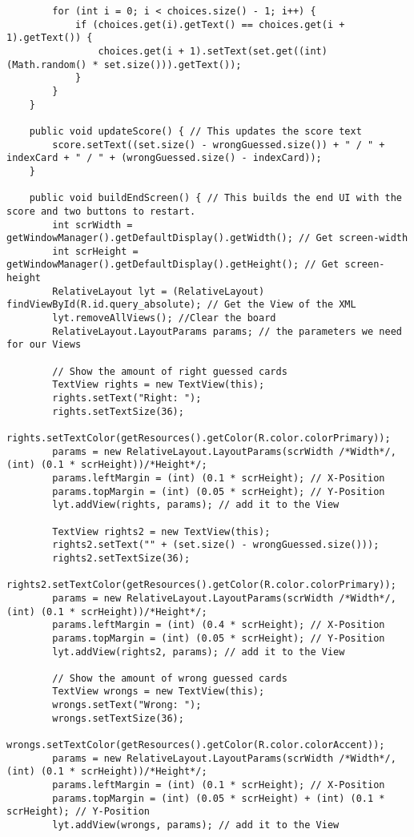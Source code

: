 \begin{lstlisting}
        for (int i = 0; i < choices.size() - 1; i++) {
            if (choices.get(i).getText() == choices.get(i + 1).getText()) {
                choices.get(i + 1).setText(set.get((int) (Math.random() * set.size())).getText());
            }
        }
    }

    public void updateScore() { // This updates the score text
        score.setText((set.size() - wrongGuessed.size()) + " / " + indexCard + " / " + (wrongGuessed.size() - indexCard));
    }

    public void buildEndScreen() { // This builds the end UI with the score and two buttons to restart.
        int scrWidth = getWindowManager().getDefaultDisplay().getWidth(); // Get screen-width
        int scrHeight = getWindowManager().getDefaultDisplay().getHeight(); // Get screen-height
        RelativeLayout lyt = (RelativeLayout) findViewById(R.id.query_absolute); // Get the View of the XML
        lyt.removeAllViews(); //Clear the board
        RelativeLayout.LayoutParams params; // the parameters we need for our Views

        // Show the amount of right guessed cards
        TextView rights = new TextView(this);
        rights.setText("Right: ");
        rights.setTextSize(36);
        rights.setTextColor(getResources().getColor(R.color.colorPrimary));
        params = new RelativeLayout.LayoutParams(scrWidth /*Width*/, (int) (0.1 * scrHeight))/*Height*/;
        params.leftMargin = (int) (0.1 * scrHeight); // X-Position
        params.topMargin = (int) (0.05 * scrHeight); // Y-Position
        lyt.addView(rights, params); // add it to the View

        TextView rights2 = new TextView(this);
        rights2.setText("" + (set.size() - wrongGuessed.size()));
        rights2.setTextSize(36);
        rights2.setTextColor(getResources().getColor(R.color.colorPrimary));
        params = new RelativeLayout.LayoutParams(scrWidth /*Width*/, (int) (0.1 * scrHeight))/*Height*/;
        params.leftMargin = (int) (0.4 * scrHeight); // X-Position
        params.topMargin = (int) (0.05 * scrHeight); // Y-Position
        lyt.addView(rights2, params); // add it to the View

        // Show the amount of wrong guessed cards
        TextView wrongs = new TextView(this);
        wrongs.setText("Wrong: ");
        wrongs.setTextSize(36);
        wrongs.setTextColor(getResources().getColor(R.color.colorAccent));
        params = new RelativeLayout.LayoutParams(scrWidth /*Width*/, (int) (0.1 * scrHeight))/*Height*/;
        params.leftMargin = (int) (0.1 * scrHeight); // X-Position
        params.topMargin = (int) (0.05 * scrHeight) + (int) (0.1 * scrHeight); // Y-Position
        lyt.addView(wrongs, params); // add it to the View


\end{lstlisting}
